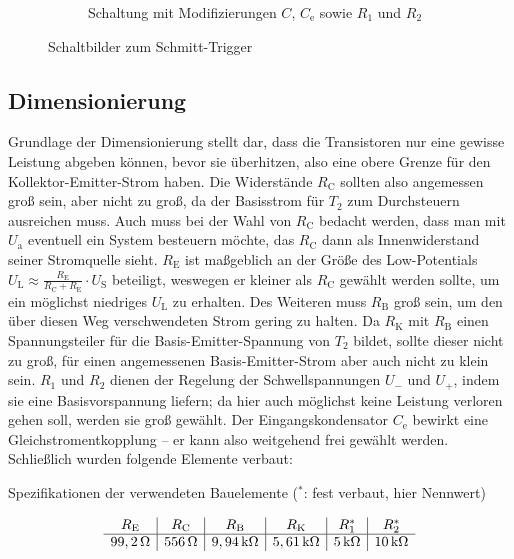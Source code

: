 \documentclass[numbers=noenddot,12pt,a4paper]{scrartcl}
\newcommand{\ix}[1]{_\text{#1}}
\begin{document}
\begin{figure}[H]
\begin{subfigure}[b]{0.49\textwidth}
\caption{Schaltung mit Modifizierungen $C$, $C\ix{e}$ sowie $R_1$ und $R_2$}
\label{img:mod}
\end{subfigure}
\caption{Schaltbilder zum Schmitt-Trigger}
\end{figure}
\subsection{Dimensionierung}
Grundlage der Dimensionierung stellt dar, dass die Transistoren nur eine gewisse Leistung abgeben können, bevor sie überhitzen, also eine obere Grenze für den Kollektor-Emitter-Strom haben. Die Widerstände $R\ix{C}$ sollten also angemessen groß sein, aber nicht zu groß, da der Basisstrom für $T_2$ zum Durchsteuern ausreichen muss. Auch muss bei der Wahl von $R\ix{C}$ bedacht werden, dass man mit $U\ix{a}$ eventuell ein System besteuern möchte, das $R\ix{C}$ dann als Innenwiderstand seiner Stromquelle sieht. $R\ix{E}$ ist maßgeblich an der Größe des Low-Potentials $U\ix{L}\approx\frac{R\ix{E}}{R\ix{C}+R\ix{E}}\cdot U\ix{S}$ beteiligt, weswegen er kleiner als $R\ix{C}$ gewählt werden sollte, um ein möglichst niedriges $U\ix{L}$ zu erhalten. Des Weiteren muss $R\ix{B}$ groß sein, um den über diesen Weg verschwendeten Strom gering zu halten. Da $R\ix{K}$ mit $R\ix{B}$ einen Spannungsteiler für die Basis-Emitter-Spannung von $T\ix{2}$ bildet, sollte dieser nicht zu groß, für einen angemessenen Basis-Emitter-Strom aber auch nicht zu klein sein. $R_1$ und $R_2$ dienen der Regelung der Schwellspannungen $U_-$ und $U_+$, indem sie eine Basisvorspannung liefern; da hier auch möglichst keine Leistung verloren gehen soll, werden sie groß gewählt. Der Eingangskondensator $C\ix{e}$ bewirkt eine Gleichstromentkopplung -- er kann also weitgehend frei gewählt werden. Schließlich wurden folgende Elemente verbaut:
\begin{table}[H]
\caption{Spezifikationen der verwendeten Bauelemente ($^*$: fest verbaut, hier Nennwert)}
\vspace{-1em}
\begin{align*}
\begin{array}{c|c|c|c|c|c}
R\ix{E} & R\ix{C} & R\ix{B} & R\ix{K} & R_1^* & R_2^* \\ \hline
\unit[99,2]{\Omega} & \unit[556]{\Omega} & \unit[9,94]{k\Omega} & \unit[5,61]{k\Omega} & \unit[5]{k\Omega} & \unit[10]{k\Omega}
\end{array} 
\end{align*}
\end{table}
\end{document}
